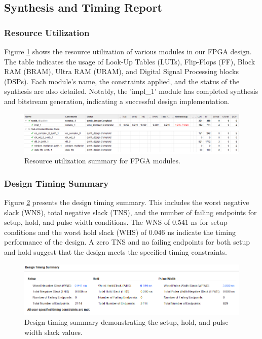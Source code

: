 \subsection{Synthesis and Timing Report}

\subsubsection{Resource Utilization}
Figure \ref{fig:resource_util} shows the resource utilization of various modules in our FPGA design. The table indicates the usage of Look-Up Tables (LUTs), Flip-Flops (FF), Block RAM (BRAM), Ultra RAM (URAM), and Digital Signal Processing blocks (DSPs). Each module's name, the constraints applied, and the status of the synthesis are also detailed. Notably, the 'impl\_1' module has completed synthesis and bitstream generation, indicating a successful design implementation.

\begin{figure}[htbp]
\centering
\includegraphics[width=\textwidth]{Sections/RESULTS/Images/resource-util.png}
\caption{Resource utilization summary for FPGA modules.}
\label{fig:resource_util}
\end{figure}

\subsubsection{Design Timing Summary}
Figure \ref{fig:timing_summary} presents the design timing summary. This includes the worst negative slack (WNS), total negative slack (TNS), and the number of failing endpoints for setup, hold, and pulse width conditions. The WNS of 0.541 ns for setup conditions and the worst hold slack (WHS) of 0.046 ns indicate the timing performance of the design. A zero TNS and no failing endpoints for both setup and hold suggest that the design meets the specified timing constraints.

\begin{figure}[htbp]
\centering
\includegraphics[width=\textwidth]{Sections/RESULTS/Images/timing.png}
\caption{Design timing summary demonstrating the setup, hold, and pulse width slack values.}
\label{fig:timing_summary}
\end{figure}
